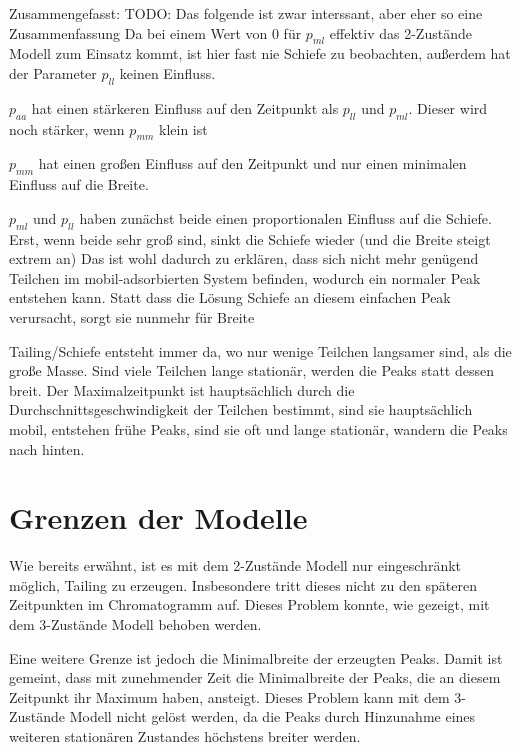 Zusammengefasst: 
TODO: Das folgende ist zwar interssant, aber eher so eine Zusammenfassung
Da bei einem Wert von $0$ für $p_{ml}$ effektiv das 2-Zustände Modell zum Einsatz kommt, ist hier fast nie Schiefe zu beobachten, außerdem hat der Parameter $p_{ll}$ keinen Einfluss. 

$p_{aa}$ hat einen stärkeren Einfluss auf den Zeitpunkt als $p_{ll}$ und $p_{ml}$. Dieser wird noch stärker, wenn $p_{mm}$ klein ist

$p_{mm}$ hat einen großen Einfluss auf den Zeitpunkt und nur einen minimalen Einfluss auf die Breite.

$p_{ml}$ und $p_{ll}$ haben zunächst beide einen proportionalen Einfluss auf die Schiefe. Erst, wenn beide sehr groß sind, sinkt die Schiefe wieder (und die Breite steigt extrem an) Das ist wohl dadurch zu erklären, dass sich nicht mehr genügend Teilchen im mobil-adsorbierten System befinden, wodurch ein normaler Peak entstehen kann. Statt dass die Lösung Schiefe an diesem einfachen Peak verursacht, sorgt sie nunmehr für Breite

Tailing/Schiefe entsteht immer da, wo nur wenige Teilchen langsamer sind, als die große Masse. Sind viele Teilchen lange stationär, werden die Peaks statt dessen breit. Der Maximalzeitpunkt ist hauptsächlich durch die Durchschnittsgeschwindigkeit der Teilchen bestimmt, sind sie hauptsächlich mobil, entstehen frühe Peaks, sind sie oft und lange stationär, wandern die Peaks nach hinten.


\section{Grenzen der Modelle}

Wie bereits erwähnt, ist es mit dem 2-Zustände Modell nur eingeschränkt möglich, Tailing zu erzeugen. Insbesondere tritt dieses nicht zu den späteren Zeitpunkten im Chromatogramm auf. Dieses Problem konnte, wie gezeigt, mit dem 3-Zustände Modell behoben werden. 

Eine weitere Grenze ist jedoch die Minimalbreite der erzeugten Peaks. Damit ist gemeint, dass mit zunehmender Zeit die Minimalbreite der Peaks, die an diesem Zeitpunkt ihr Maximum haben, ansteigt. 
Dieses Problem kann mit dem 3-Zustände Modell nicht gelöst werden, da die Peaks durch Hinzunahme eines weiteren stationären Zustandes höchstens breiter werden. 


